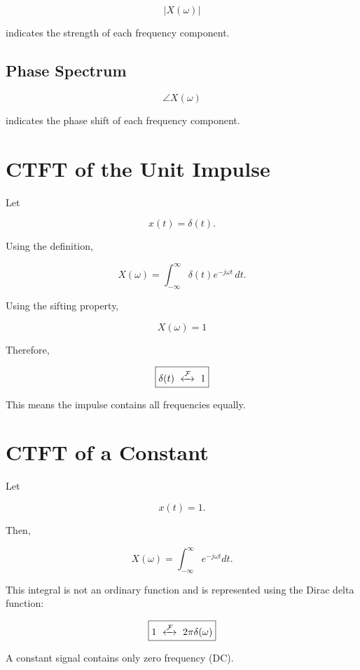 \[
\boxed{
|X(\omega)|
}
\]

indicates the strength of each frequency component.


\subsection{Phase Spectrum}

\[
\boxed{
\angle X(\omega)
}
\]

indicates the phase shift of each frequency component.


\section{CTFT of the Unit Impulse}

Let

\[
x(t)=\delta(t).
\]

Using the definition,

\[
X(\omega)=
\int_{-\infty}^{\infty}
\delta(t)e^{-j\omega t}\,dt.
\]

Using the sifting property,

\[
\boxed{
X(\omega)=1
}
\]

Therefore,

\[
\boxed{
\delta(t)\ \xleftrightarrow{\mathcal{F}}\ 1
}
\]

This means the impulse contains all frequencies equally.


\section{CTFT of a Constant}

Let

\[
x(t)=1.
\]

Then,

\[
X(\omega)=
\int_{-\infty}^{\infty}e^{-j\omega t}dt.
\]

This integral is not an ordinary function and is represented using the Dirac
delta function:

\[
\boxed{
1\ \xleftrightarrow{\mathcal{F}}\ 2\pi\delta(\omega)
}
\]

A constant signal contains only zero frequency (DC).

